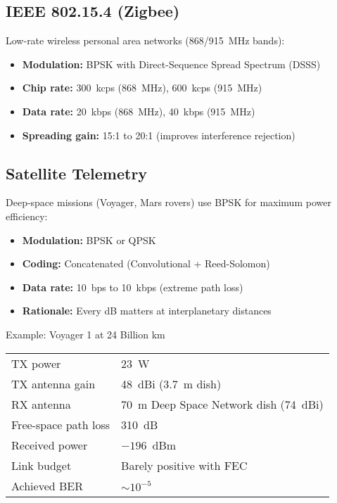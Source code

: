 \subsection{IEEE 802.15.4 (Zigbee)}

Low-rate wireless personal area networks (868/915~MHz bands):
\begin{itemize}
\item \textbf{Modulation:} BPSK with Direct-Sequence Spread Spectrum (DSSS)
\item \textbf{Chip rate:} 300~kcps (868~MHz), 600~kcps (915~MHz)
\item \textbf{Data rate:} 20~kbps (868~MHz), 40~kbps (915~MHz)
\item \textbf{Spreading gain:} 15:1 to 20:1 (improves interference rejection)
\end{itemize}

\subsection{Satellite Telemetry}

Deep-space missions (Voyager, Mars rovers) use BPSK for maximum power efficiency:
\begin{itemize}
\item \textbf{Modulation:} BPSK or QPSK
\item \textbf{Coding:} Concatenated (Convolutional + Reed-Solomon)
\item \textbf{Data rate:} 10~bps to 10~kbps (extreme path loss)
\item \textbf{Rationale:} Every dB matters at interplanetary distances
\end{itemize}

\begin{calloutbox}[colback=black!5!white,colframe=black]{Example: Voyager 1 at 24 Billion km}
\begin{tabular}{@{}ll@{}}
TX power & 23~W \\
TX antenna gain & 48~dBi (3.7~m dish) \\
RX antenna & 70~m Deep Space Network dish (74~dBi) \\
Free-space path loss & 310~dB \\
Received power & $-196$~dBm \\
Link budget & Barely positive with FEC \\
Achieved BER & $\sim 10^{-5}$ \\
\end{tabular}
\end{calloutbox}

